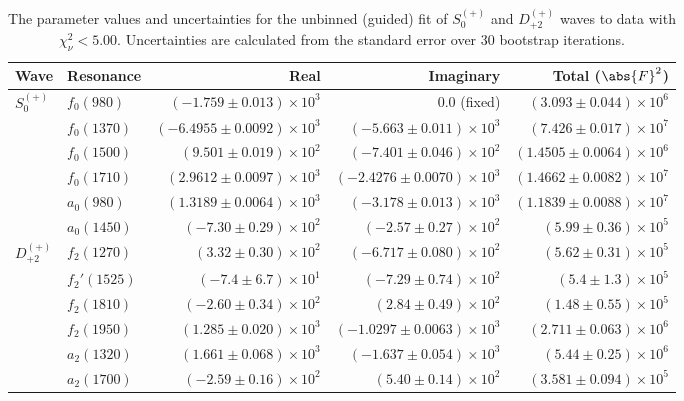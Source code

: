 \begin{table}[ht]
    \begin{center}
        \begin{tabular}{llrrr}\toprule
        Wave & Resonance & Real & Imaginary & Total ($\abs{F}^2$) \\\midrule
$S_{0}^{(+)}$ & $f_{0}(980)$ & $(-1.759 \pm 0.013) \times 10^{3}$ & $0.0$ (fixed) & $(3.093 \pm 0.044) \times 10^{6}$ \\
 & $f_{0}(1370)$ & $(-6.4955 \pm 0.0092) \times 10^{3}$ & $(-5.663 \pm 0.011) \times 10^{3}$ & $(7.426 \pm 0.017) \times 10^{7}$ \\
 & $f_{0}(1500)$ & $(9.501 \pm 0.019) \times 10^{2}$ & $(-7.401 \pm 0.046) \times 10^{2}$ & $(1.4505 \pm 0.0064) \times 10^{6}$ \\
 & $f_{0}(1710)$ & $(2.9612 \pm 0.0097) \times 10^{3}$ & $(-2.4276 \pm 0.0070) \times 10^{3}$ & $(1.4662 \pm 0.0082) \times 10^{7}$ \\
 & $a_{0}(980)$ & $(1.3189 \pm 0.0064) \times 10^{3}$ & $(-3.178 \pm 0.013) \times 10^{3}$ & $(1.1839 \pm 0.0088) \times 10^{7}$ \\
 & $a_{0}(1450)$ & $(-7.30 \pm 0.29) \times 10^{2}$ & $(-2.57 \pm 0.27) \times 10^{2}$ & $(5.99 \pm 0.36) \times 10^{5}$ \\
$D_{+2}^{(+)}$ & $f_{2}(1270)$ & $(3.32 \pm 0.30) \times 10^{2}$ & $(-6.717 \pm 0.080) \times 10^{2}$ & $(5.62 \pm 0.31) \times 10^{5}$ \\
 & $f_{2}'(1525)$ & $(-7.4 \pm 6.7) \times 10^{1}$ & $(-7.29 \pm 0.74) \times 10^{2}$ & $(5.4 \pm 1.3) \times 10^{5}$ \\
 & $f_{2}(1810)$ & $(-2.60 \pm 0.34) \times 10^{2}$ & $(2.84 \pm 0.49) \times 10^{2}$ & $(1.48 \pm 0.55) \times 10^{5}$ \\
 & $f_{2}(1950)$ & $(1.285 \pm 0.020) \times 10^{3}$ & $(-1.0297 \pm 0.0063) \times 10^{3}$ & $(2.711 \pm 0.063) \times 10^{6}$ \\
 & $a_{2}(1320)$ & $(1.661 \pm 0.068) \times 10^{3}$ & $(-1.637 \pm 0.054) \times 10^{3}$ & $(5.44 \pm 0.25) \times 10^{6}$ \\
 & $a_{2}(1700)$ & $(-2.59 \pm 0.16) \times 10^{2}$ & $(5.40 \pm 0.14) \times 10^{2}$ & $(3.581 \pm 0.094) \times 10^{5}$ \\\bottomrule
        \end{tabular}
    \caption{The parameter values and uncertainties for the unbinned (guided) fit of $S_{0}^{(+)}$ and $D_{+2}^{(+)}$ waves to data with $\chi^2_\nu < 5.00$. Uncertainties are calculated from the standard error over $30$ bootstrap iterations.}\label{tab:unbinned-fit-chisqdof-5.0-guided-Sp0p-Dp2p}
    \end{center}
\end{table}
